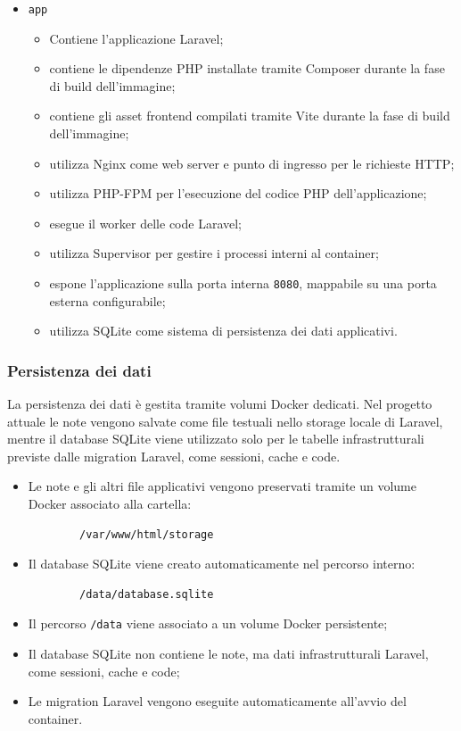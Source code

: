 \documentclass[a4paper,10pt]{article}
\begin{document}
\begin{itemize}
    \item \texttt{app}
        \begin{itemize}
            \item Contiene l'applicazione Laravel;
            \item contiene le dipendenze PHP installate tramite Composer durante la fase di build dell'immagine;
            \item contiene gli asset frontend compilati tramite Vite durante la fase di build dell'immagine;
            \item utilizza Nginx come web server e punto di ingresso per le richieste HTTP;
            \item utilizza PHP-FPM per l'esecuzione del codice PHP dell'applicazione;
            \item esegue il worker delle code Laravel;
            \item utilizza Supervisor per gestire i processi interni al container;
            \item espone l'applicazione sulla porta interna \texttt{8080}, mappabile su una porta esterna configurabile;
            \item utilizza SQLite come sistema di persistenza dei dati applicativi.
        \end{itemize}
\end{itemize}

\subsubsection{Persistenza dei dati}
La persistenza dei dati è gestita tramite volumi Docker dedicati. Nel progetto attuale le note vengono salvate come file testuali nello storage locale di Laravel, mentre il database SQLite viene utilizzato solo per le tabelle infrastrutturali previste dalle migration Laravel, come sessioni, cache e code.

\begin{itemize}
    \item Le note e gli altri file applicativi vengono preservati tramite un volume Docker associato alla cartella:
        \begin{lstlisting}
        /var/www/html/storage
        \end{lstlisting}

    \item Il database SQLite viene creato automaticamente nel percorso interno:
        \begin{lstlisting}
        /data/database.sqlite
        \end{lstlisting}

    \item Il percorso \texttt{/data} viene associato a un volume Docker persistente;

    \item Il database SQLite non contiene le note, ma dati infrastrutturali Laravel, come sessioni, cache e code;

    \item Le migration Laravel vengono eseguite automaticamente all'avvio del container.
\end{itemize}
\end{document}
